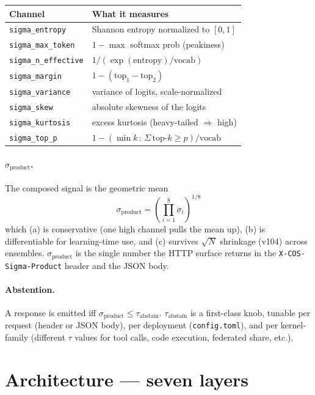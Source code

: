 \documentclass[11pt,letterpaper]{article}
\newcommand{\sigprod}{\sigma_{\mathrm{product}}}
\newcommand{\tabstain}{\tau_{\mathrm{abstain}}}
\newcommand{\code}[1]{\texttt{#1}}
\begin{document}
\begin{center}
\begin{tabular}{@{}ll@{}}
\toprule
\textbf{Channel} & \textbf{What it measures} \\
\midrule
\code{sigma\_entropy}      & Shannon entropy normalized to $[0,1]$ \\
\code{sigma\_max\_token}   & $1 - \max$ softmax prob (peakiness) \\
\code{sigma\_n\_effective} & $1 / (\exp(\text{entropy})/\text{vocab})$ \\
\code{sigma\_margin}       & $1 - (\text{top}_1 - \text{top}_2)$ \\
\code{sigma\_variance}     & variance of logits, scale-normalized \\
\code{sigma\_skew}         & absolute skewness of the logits \\
\code{sigma\_kurtosis}     & excess kurtosis (heavy-tailed $\Rightarrow$ high) \\
\code{sigma\_top\_p}       & $1 - (\min k\, :\, \Sigma\,\text{top-}k \ge p)/\text{vocab}$ \\
\bottomrule
\end{tabular}
\end{center}

\paragraph{$\sigprod$.} The composed signal is the geometric mean
\begin{equation}
  \sigprod = \left( \prod_{i=1}^{8} \sigma_i \right)^{1/8}
\end{equation}
which (a) is conservative (one high channel pulls the mean up),
(b) is differentiable for learning-time use, and (c) survives
$\sqrt{N}$ shrinkage (v104) across ensembles. $\sigprod$ is the
single number the HTTP surface returns in the
\code{X-COS-Sigma-Product} header and the JSON body.

\paragraph{Abstention.} A response is emitted iff
$\sigprod \le \tabstain$. $\tabstain$ is a first-class knob,
tunable per request (header or JSON body), per deployment
(\code{config.toml}), and per kernel-family (different $\tau$
values for tool calls, code execution, federated share, etc.).

\section{Architecture --- seven layers}
\end{document}
